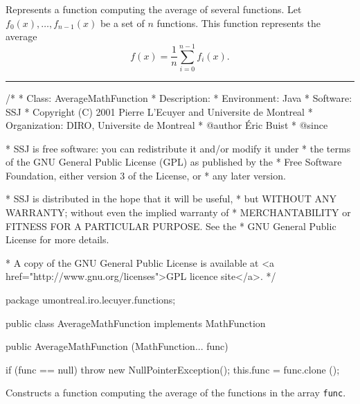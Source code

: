 
Represents a function computing the average of several functions.
Let $f_0(x), \ldots, f_{n-1}(x)$ be a set of $n$ functions.
This function represents the average \[f(x)=\frac1n\sum_{i=0}^{n-1} f_i(x).\]

\bigskip\hrule

\begin{code}
\begin{hide}
/*
 * Class:        AverageMathFunction
 * Description:  
 * Environment:  Java
 * Software:     SSJ 
 * Copyright (C) 2001  Pierre L'Ecuyer and Universite de Montreal
 * Organization: DIRO, Universite de Montreal
 * @author       Éric Buist
 * @since

 * SSJ is free software: you can redistribute it and/or modify it under
 * the terms of the GNU General Public License (GPL) as published by the
 * Free Software Foundation, either version 3 of the License, or
 * any later version.

 * SSJ is distributed in the hope that it will be useful,
 * but WITHOUT ANY WARRANTY; without even the implied warranty of
 * MERCHANTABILITY or FITNESS FOR A PARTICULAR PURPOSE.  See the
 * GNU General Public License for more details.

 * A copy of the GNU General Public License is available at
   <a href="http://www.gnu.org/licenses">GPL licence site</a>.
 */
\end{hide}
package umontreal.iro.lecuyer.functions;\begin{hide}

\end{hide}

public class AverageMathFunction implements MathFunction\begin{hide}

,
   MathFunctionWithFirstDerivative, MathFunctionWithDerivative,
   MathFunctionWithIntegral {
   private MathFunction[] func;
\end{hide}

   public AverageMathFunction (MathFunction... func)\begin{hide} {
      if (func == null)
         throw new NullPointerException();
      this.func = func.clone ();
   }\end{hide}
\end{code}
\begin{tabb}   Constructs a function computing the average
 of the functions in the array \texttt{func}.
\end{tabb}
